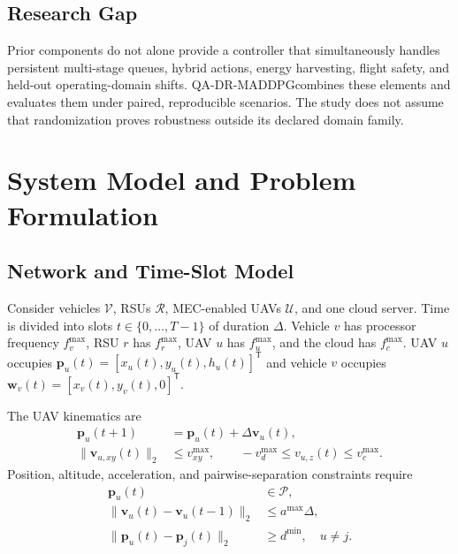 \documentclass[journal]{IEEEtran}
\newcommand{\method}{QA-DR-MADDPG}
\newcommand{\vect}[1]{\boldsymbol{#1}}
\begin{document}
\subsection{Research Gap}
Prior components do not alone provide a controller that simultaneously
handles persistent multi-stage queues, hybrid actions, energy harvesting,
flight safety, and held-out operating-domain shifts. \method combines these
elements and evaluates them under paired, reproducible scenarios. The study
does not assume that randomization proves robustness outside its declared
domain family.
\fi



\iffalse
\section{System Model and Problem Formulation}
\subsection{Network and Time-Slot Model}
Consider vehicles $\mathcal V$, RSUs $\mathcal R$, MEC-enabled UAVs
$\mathcal U$, and one cloud server. Time is divided into slots
$t\in\{0,\ldots,T-1\}$ of duration $\Delta$. Vehicle $v$ has processor
frequency $f_v^{\max}$, RSU $r$ has $f_r^{\max}$, UAV $u$ has
$f_u^{\max}$, and the cloud has $f_c^{\max}$. UAV $u$ occupies
$\vect p_u(t)=[x_u(t),y_u(t),h_u(t)]^\mathsf T$ and vehicle $v$ occupies
$\vect w_v(t)=[x_v(t),y_v(t),0]^\mathsf T$.

The UAV kinematics are
\begin{align}
\vect p_u(t+1)&=\vect p_u(t)+\Delta\vect v_u(t),\\
\|\vect v_{u,xy}(t)\|_2&\le v_{xy}^{\max},\qquad
-v_d^{\max}\le v_{u,z}(t)\le v_c^{\max}.
\end{align}
Position, altitude, acceleration, and pairwise-separation constraints require
\begin{align}
\vect p_u(t)&\in\mathcal P,\\
\|\vect v_u(t)-\vect v_u(t-1)\|_2&\le a^{\max}\Delta,\\
\|\vect p_u(t)-\vect p_j(t)\|_2&\ge d^{\min},\quad u\ne j.
\end{align}
\end{document}
